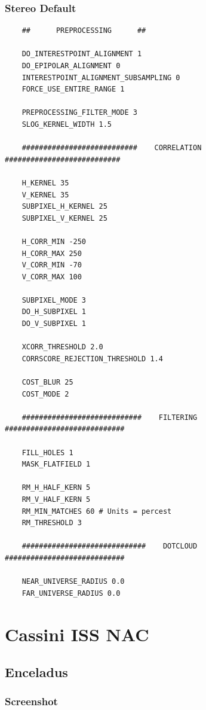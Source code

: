 \subsubsection*{Stereo Default}

\begin{verbatim}
    ##      PREPROCESSING      ##

    DO_INTERESTPOINT_ALIGNMENT 1
    DO_EPIPOLAR_ALIGNMENT 0
    INTERESTPOINT_ALIGNMENT_SUBSAMPLING 0
    FORCE_USE_ENTIRE_RANGE 1

    PREPROCESSING_FILTER_MODE 3
    SLOG_KERNEL_WIDTH 1.5

    ###########################    CORRELATION    ###########################

    H_KERNEL 35
    V_KERNEL 35
    SUBPIXEL_H_KERNEL 25
    SUBPIXEL_V_KERNEL 25

    H_CORR_MIN -250
    H_CORR_MAX 250
    V_CORR_MIN -70
    V_CORR_MAX 100

    SUBPIXEL_MODE 3
    DO_H_SUBPIXEL 1
    DO_V_SUBPIXEL 1

    XCORR_THRESHOLD 2.0
    CORRSCORE_REJECTION_THRESHOLD 1.4

    COST_BLUR 25
    COST_MODE 2

    ############################    FILTERING    ############################

    FILL_HOLES 1
    MASK_FLATFIELD 1

    RM_H_HALF_KERN 5
    RM_V_HALF_KERN 5
    RM_MIN_MATCHES 60 # Units = percest
    RM_THRESHOLD 3

    #############################    DOTCLOUD    ############################

    NEAR_UNIVERSE_RADIUS 0.0
    FAR_UNIVERSE_RADIUS 0.0

\end{verbatim}

\section{Cassini ISS NAC}

\subsection{Enceladus}

\subsubsection*{Screenshot}

